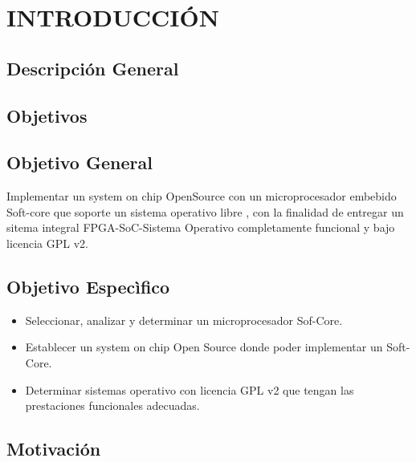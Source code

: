 \chapter{INTRODUCCIÓN}


\section{Descripción General}



\section{Objetivos}
\section{Objetivo General}

Implementar un system on chip OpenSource con un microprocesador embebido Soft-core que soporte un sistema operativo libre , con la finalidad de entregar un sitema integral FPGA-SoC-Sistema Operativo completamente funcional y bajo licencia GPL v2.

\section{Objetivo Especìfico}
\begin{itemize}
\item Seleccionar, analizar y determinar un microprocesador Sof-Core.
\item Establecer un system on chip Open Source donde poder implementar un Soft-Core.
\item Determinar sistemas operativo con licencia GPL v2 que tengan las prestaciones funcionales adecuadas.
\end{itemize}

\section{Motivación} 

